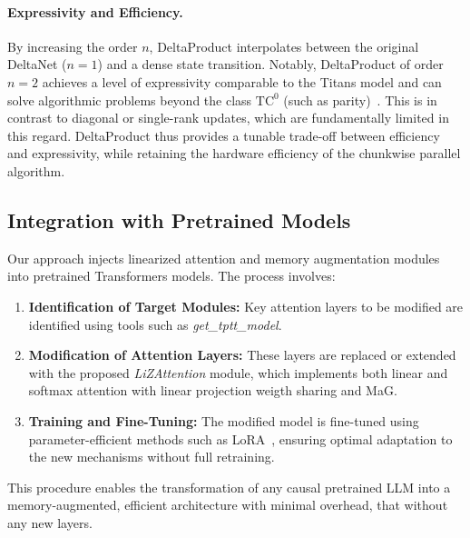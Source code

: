 \documentclass[10pt,a4paper]{article}
\begin{document}
\paragraph{Expressivity and Efficiency.}

By increasing the order $n$, DeltaProduct interpolates between the original DeltaNet ($n=1$) and a dense state transition. Notably, DeltaProduct of order $n=2$ achieves a level of expressivity comparable to the Titans model and can solve algorithmic problems beyond the class $\mathrm{TC}^0$ (such as parity)~\cite{siems2025deltaproduct, merrill2024illusion}. This is in contrast to diagonal or single-rank updates, which are fundamentally limited in this regard. DeltaProduct thus provides a tunable trade-off between efficiency and expressivity, while retaining the hardware efficiency of the chunkwise parallel algorithm.





\subsection{Integration with Pretrained Models}

Our approach injects linearized attention and memory augmentation modules into pretrained Transformers models. The process involves:
\begin{enumerate}
    \item \textbf{Identification of Target Modules:} Key attention layers to be modified are identified using tools such as \textit{get\_tptt\_model}.
    \item \textbf{Modification of Attention Layers:} These layers are replaced or extended with the proposed \textit{LiZAttention} module, which implements both linear and softmax attention with linear projection weigth sharing and MaG.
    \item \textbf{Training and Fine-Tuning:} The modified model is fine-tuned using parameter-efficient methods such as LoRA~\cite{hu2022lora}, ensuring optimal adaptation to the new mechanisms without full retraining.
\end{enumerate}
This procedure enables the transformation of any causal pretrained LLM into a memory-augmented, efficient architecture with minimal overhead, that without any new layers.
\end{document}
